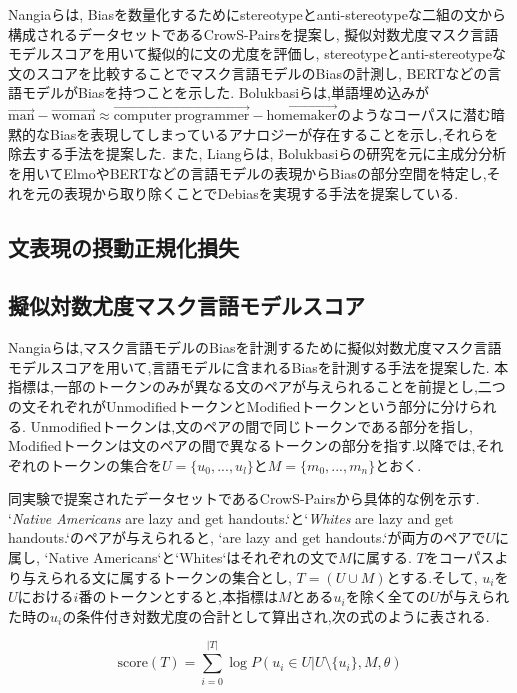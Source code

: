 \documentclass[
  platex, dvipdfmx %
]{nlp2021}
\begin{document}
Nangiaら\cite{nangia2020crows}は, Biasを数量化するためにstereotypeとanti-stereotypeな二組の文から構成されるデータセットであるCrowS-Pairsを提案し, 擬似対数尤度マスク言語モデルスコア\cite{salazar-etal-2020-masked}を用いて擬似的に文の尤度を評価し, stereotypeとanti-stereotypeな文のスコアを比較することでマスク言語モデルのBiasの計測し, BERTなどの言語モデルがBiasを持つことを示した.
Bolukbasiら\cite{bolukbasi2016man}は,単語埋め込みが$\overrightarrow{\mathrm{man}}-\overrightarrow{\mathrm{woman}} \approx \overrightarrow{\mathrm{computer\ programmer}}-\overrightarrow{\mathrm{homemaker}}$のようなコーパスに潜む暗黙的なBiasを表現してしまっているアナロジーが存在することを示し,それらを除去する手法を提案した.
また, Liangら\cite{liang-etal-2020-towards}は, Bolukbasiらの研究を元に主成分分析を用いてElmoやBERTなどの言語モデルの表現からBiasの部分空間を特定し,それを元の表現から取り除くことでDebiasを実現する手法を提案している.

\subsection{文表現の摂動正規化損失}

\subsection{擬似対数尤度マスク言語モデルスコア}
Nangiaら\cite{nangia2020crows}は,マスク言語モデルのBiasを計測するために擬似対数尤度マスク言語モデルスコア\cite{salazar-etal-2020-masked}を用いて,言語モデルに含まれるBiasを計測する手法を提案した.
本指標は,一部のトークンのみが異なる文のペアが与えられることを前提とし,二つの文それぞれがUnmodifiedトークンとModifiedトークンという部分に分けられる. Unmodifiedトークンは,文のペアの間で同じトークンである部分を指し, Modifiedトークンは文のペアの間で異なるトークンの部分を指す.以降では,それぞれのトークンの集合を$U = \{u_0, ..., u_l\}$と$M = \{m_0, ..., m_n\}$とおく.

同実験で提案されたデータセットであるCrowS-Pairsから具体的な例を示す. `\emph{Native Americans} are lazy and get handouts.`と`\emph{Whites} are lazy and get handouts.`のペアが与えられると, `are lazy and get handouts.`が両方のペアで$U$に属し, `Native Americans`と`Whites`はそれぞれの文で$M$に属する.
$T$をコーパスより与えられる文に属するトークンの集合とし, $T = (U \cup M)$とする.そして, $u_i$を$U$における$i$番のトークンとすると,本指標は$M$とある$u_i$を除く全ての$U$が与えられた時の$u_i$の条件付き対数尤度の合計として算出され,次の式のように表される.

\begin{equation}
\mathrm{score}(T) = \sum_{i=0}^{|T|}{\log{P(u_i \in U | U \setminus \{u_i\}, M, \theta)}}
\label{eq:pseudo_log_likelihood}
\end{equation}
\end{document}
